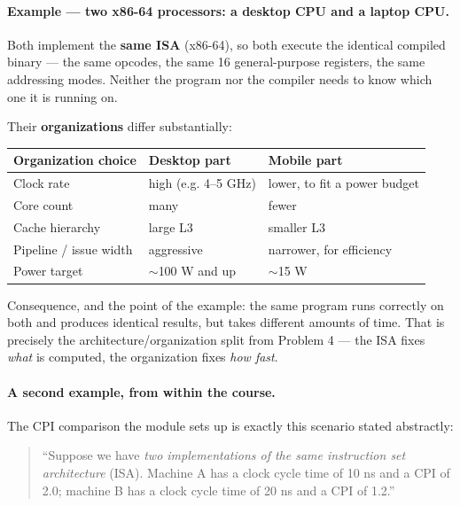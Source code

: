 \paragraph{Example — two x86-64 processors: a desktop CPU and a laptop CPU.}

Both implement the \textbf{same ISA} (x86-64), so both execute the identical
compiled binary — the same opcodes, the same 16 general-purpose registers, the
same addressing modes. Neither the program nor the compiler needs to know which
one it is running on.

Their \textbf{organizations} differ substantially:

\begin{center}
\begin{tabular}{lll}
  \toprule
  Organization choice & Desktop part & Mobile part \\
  \midrule
  Clock rate      & high (e.g. 4--5 GHz)     & lower, to fit a power budget \\
  Core count      & many                     & fewer \\
  Cache hierarchy & large L3                 & smaller L3 \\
  Pipeline / issue width & aggressive        & narrower, for efficiency \\
  Power target    & $\sim$100 W and up       & $\sim$15 W \\
  \bottomrule
\end{tabular}
\end{center}

Consequence, and the point of the example: the same program runs correctly on
both and produces identical results, but takes different amounts of time. That
is precisely the architecture/organization split from Problem 4 — the ISA fixes
\emph{what} is computed, the organization fixes \emph{how fast}.

\paragraph{A second example, from within the course.}
The CPI comparison the module sets up  is exactly this
scenario stated abstractly:

\begin{quote}
``Suppose we have \emph{two implementations of the same instruction set
architecture} (ISA). Machine A has a clock cycle time of 10 ns and a CPI of 2.0;
machine B has a clock cycle time of 20 ns and a CPI of 1.2.''
\end{quote}

